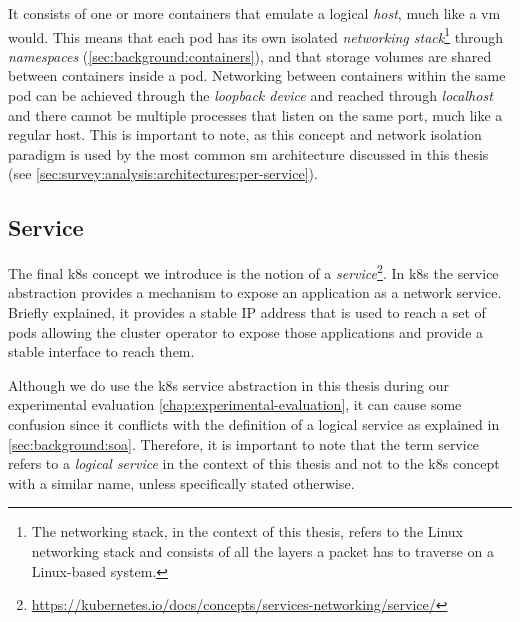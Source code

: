 It consists of one or more containers that emulate a logical \textit{host}, much like a \gls{vm} would. This means that each \gls{pod} has its own isolated \textit{networking stack}\footnote{The networking stack, in the context of this thesis, refers to the Linux networking stack and consists of all the layers a packet has to traverse on a Linux-based system.} through \textit{namespaces} (\cref{sec:background:containers}), and that storage volumes are shared between containers inside a \gls{pod}. Networking between containers within the same \gls{pod} can be achieved through the \textit{loopback device} and reached through \textit{localhost} and there cannot be multiple processes that listen on the same port, much like a regular host. This is important to note, as this concept and network isolation paradigm is used by the most common \gls{sm} architecture discussed in this thesis (see \cref{sec:survey:analysis:architectures:per-service}).


\subsection{Service}
\label{sec:background:kubernetes:service}

The final \gls{k8s} concept we introduce is the notion of a \textit{service}\footnote{\url{https://kubernetes.io/docs/concepts/services-networking/service/}}. In \gls{k8s} the service abstraction provides a mechanism to expose an application as a network service. Briefly explained, it provides a stable IP address that is used to reach a set of \glspl{pod} allowing the cluster operator to expose those applications and provide a stable interface to reach them. 

Although we do use the \gls{k8s} service abstraction in this thesis during our experimental evaluation \cref{chap:experimental-evaluation}, it can cause some confusion since it conflicts with the definition of a logical service as explained in \cref{sec:background:soa}. Therefore, it is important to note that the term service refers to a \textit{logical service} in the context of this thesis and not to the \gls{k8s} concept with a similar name, unless specifically stated otherwise.